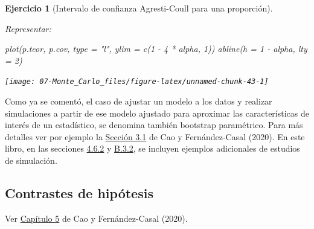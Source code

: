 \documentclass[
]{book}
\newenvironment{Shaded}{\begin{snugshade}}{\end{snugshade}}
\newcommand{\AttributeTok}[1]{\textcolor[rgb]{0.77,0.63,0.00}{#1}}
\newcommand{\DecValTok}[1]{\textcolor[rgb]{0.00,0.00,0.81}{#1}}
\newcommand{\FunctionTok}[1]{\textcolor[rgb]{0.00,0.00,0.00}{#1}}
\newcommand{\NormalTok}[1]{#1}
\newcommand{\SpecialCharTok}[1]{\textcolor[rgb]{0.00,0.00,0.00}{#1}}
\newcommand{\StringTok}[1]{\textcolor[rgb]{0.31,0.60,0.02}{#1}}
\theoremstyle{break}
\newtheorem{exercise}{Ejercicio}[chapter]
\theoremstyle{nonumberplain}
\begin{document}
\begin{exercise}[Intervalo de confianza Agresti-Coull para una proporción]
\begin{enumerate}
  Representar:

\begin{Shaded}
\begin{Highlighting}[]
\FunctionTok{plot}\NormalTok{(p.teor, p.cov, }\AttributeTok{type =} \StringTok{"l"}\NormalTok{, }\AttributeTok{ylim =} \FunctionTok{c}\NormalTok{(}\DecValTok{1} \SpecialCharTok{{-}} \DecValTok{4} \SpecialCharTok{*}\NormalTok{ alpha, }\DecValTok{1}\NormalTok{))}
\FunctionTok{abline}\NormalTok{(}\AttributeTok{h =} \DecValTok{1} \SpecialCharTok{{-}}\NormalTok{ alpha, }\AttributeTok{lty =} \DecValTok{2}\NormalTok{) }
\end{Highlighting}
\end{Shaded}

  \begin{center}\texttt{[image: 07-Monte\_Carlo\_files/figure-latex/unnamed-chunk-43-1]} \end{center}
\end{enumerate}

\end{exercise}

Como ya se comentó, el caso de ajustar un modelo a los datos y realizar simulaciones a partir de ese modelo ajustado para aproximar las características de interés de un estadístico, se denomina también bootstrap paramétrico.
Para más detalles ver por ejemplo la \href{https://rubenfcasal.github.io/book_remuestreo/modunif-boot-par.html}{Sección 3.1} de Cao y Fernández-Casal (2020).
En este libro, en las secciones \href{https://rubenfcasal.github.io/book_remuestreo/icboot-ejem.html\#estudio-sim-exp}{4.6.2} y \href{https://rubenfcasal.github.io/book_remuestreo/ejemplos-3.html\#estudio-sim-boot}{B.3.2}, se incluyen ejemplos adicionales de estudios de simulación.

\hypertarget{contrastes}{%
\subsection{Contrastes de hipótesis}\label{contrastes}}

Ver \href{https://rubenfcasal.github.io/book_remuestreo/contrastes.html}{Capítulo 5} de Cao y Fernández-Casal (2020).
\end{document}

